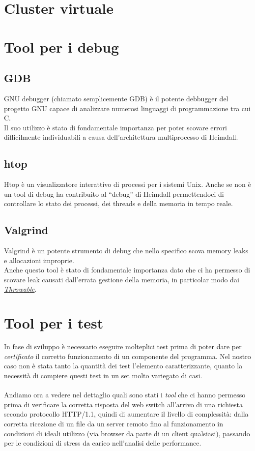 \documentclass[italian]{tktltiki2}
\begin{document}
\newpage
\section{Cluster virtuale}

\newpage
\section{Tool per i debug}
\subsection{GDB}
GNU debugger (chiamato semplicemente GDB)\cite{gdb} è il potente debbugger del progetto GNU capace di analizzare numerosi linguaggi di programmazione tra cui C.
\\
Il suo utilizzo è stato di fondamentale importanza per poter scovare errori difficilmente individuabili a causa dell'architettura multiprocesso di Heimdall.

\subsection{htop}
Htop\cite{htop} è un visualizzatore interattivo di processi per i sistemi Unix. Anche se non è un tool di debug ha contribuito al ``debug'' di Heimdall permettendoci di controllare lo stato dei processi, dei threads e della memoria in tempo reale.

\subsection{Valgrind}
Valgrind\cite{valgrind} è un potente strumento di debug che nello specifico scova memory leaks e allocazioni improprie.
\\
Anche questo tool è stato di fondamentale importanza dato che ci ha permesso di scovare leak causati dall'errata gestione della memoria, in particolar modo dai \hyperref[sec:errors]{\emph{Throwable}}.

\newpage
\section{Tool per i test}
In fase di sviluppo è necessario eseguire molteplici test prima di poter dare per \emph{certificato} il corretto funzionamento di un componente del programma. Nel nostro caso non è stata tanto la quantità dei test l'elemento caratterizzante, quanto la necessità di compiere questi test in un set molto variegato di casi. 
\\
\\
Andiamo ora a vedere nel dettaglio quali sono stati i \emph{tool} che ci hanno permesso prima di verificare la corretta risposta del web switch all'arrivo di una richiesta secondo protocollo HTTP/1.1, quindi di aumentare il livello di complessità: dalla corretta ricezione di un file da un server remoto fino al funzionamento in condizioni di ideali utilizzo (via browser da parte di un client qualsiasi), passando per le condizioni di stress da carico nell'analisi delle performance.
\end{document}

